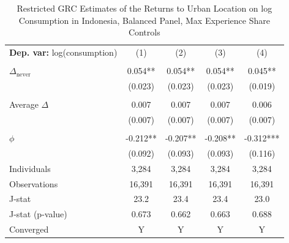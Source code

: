 \begin{table}[htbp] \centering \begin{threeparttable}
 \caption{Restricted GRC Estimates of the Returns to Urban Location on log Consumption in Indonesia, Balanced Panel, Max Experience Share Controls} 
 \label{tab:GRC_IDN_consumption_urban_bal_exp_m_sh} 
\begin{tabular}{l cccc} \toprule  \textbf{Dep. var:}  log(consumption) 
                    &\multicolumn{1}{c}{(1)}   &\multicolumn{1}{c}{(2)}   &\multicolumn{1}{c}{(3)}   &\multicolumn{1}{c}{(4)}   \\
                    &               &               &               &               \\
\addlinespace
$\Delta_{\text{never}}$&       0.054** &       0.054** &       0.054** &       0.045** \\
                    &     (0.023)   &     (0.023)   &     (0.023)   &     (0.019)   \\
                    &               &               &               &               \\
\addlinespace
Average $\Delta$    &       0.007   &       0.007   &       0.007   &       0.006   \\
                    &     (0.007)   &     (0.007)   &     (0.007)   &     (0.007)   \\
                    &               &               &               &               \\
\addlinespace
$\phi$              &      -0.212** &      -0.207** &      -0.208** &      -0.312***\\
                    &     (0.092)   &     (0.093)   &     (0.093)   &     (0.116)   \\
\addlinespace
Individuals         &       3,284   &       3,284   &       3,284   &       3,284   \\
Observations        &      16,391   &      16,391   &      16,391   &      16,391   \\
J-stat              &        23.2   &        23.4   &        23.4   &        23.0   \\
J-stat (p-value)    &       0.673   &       0.662   &       0.663   &       0.688   \\
Converged           &           Y   &           Y   &           Y   &           Y   \\

\end{tabular}
\end{threeparttable}
\end{table}
